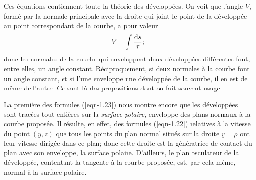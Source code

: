 Ces équations contiennent toute la théorie des développées. On voit que l'angle $V$, formé par la normale principale 
avec la droite qui joint le point de la développée au point correspondant de la courbe, a pour valeur
\[
	V - \int{\frac{\ensuremath{\operatorname{d}\!{s}}}{\tau}};
\]
donc les normales de la courbe qui enveloppent deux développées différentes font, entre elles, un angle constant. 
Réciproquement, si deux normales à la courbe font un angle constant, et si l'une enveloppe une développée de la courbe, 
il en est de même de l'autre. Ce sont là des propositions dont on fait souvent usage.

La première des formules (\ref{eqn-1.23}) nous montre encore que les développées sont tracées tout entières sur la 
\textit{surface polaire}, enveloppe des plans normaux à la courbe proposée. Il résulte, en effet, des formules 
(\ref{eqn-1.22}) relatives à la vitesse du point $(y, z)$ que tous les points du plan normal situés sur la droite 
$y=\rho$ ont leur vitesse dirigée dans ce plan; donc cette droite est la génératrice de contact du plan avec son 
enveloppe, la surface polaire. D'ailleurs, le plan osculateur de la développée, contentant la tangente à la courbe 
proposée, est, par cela même, normal à la surface polaire.
